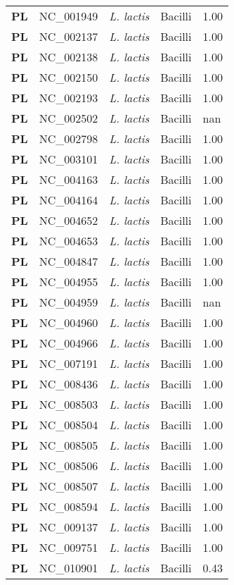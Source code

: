 \begin{adjustwidth}{-3cm}{2cm}
{\begin{supertabular}{>{\bfseries}l|p{0.1\textwidth}p{0.14\textwidth}l|l}
PL & NC\_001949 & \textit{L. lactis} & Bacilli & 1.00\\
PL & NC\_002137 & \textit{L. lactis} & Bacilli & 1.00\\
PL & NC\_002138 & \textit{L. lactis} & Bacilli & 1.00\\
PL & NC\_002150 & \textit{L. lactis} & Bacilli & 1.00\\
PL & NC\_002193 & \textit{L. lactis} & Bacilli & 1.00\\
PL & NC\_002502 & \textit{L. lactis} & Bacilli & nan\\
PL & NC\_002798 & \textit{L. lactis} & Bacilli & 1.00\\
PL & NC\_003101 & \textit{L. lactis} & Bacilli & 1.00\\
PL & NC\_004163 & \textit{L. lactis} & Bacilli & 1.00\\
PL & NC\_004164 & \textit{L. lactis} & Bacilli & 1.00\\
PL & NC\_004652 & \textit{L. lactis} & Bacilli & 1.00\\
PL & NC\_004653 & \textit{L. lactis} & Bacilli & 1.00\\
PL & NC\_004847 & \textit{L. lactis} & Bacilli & 1.00\\
PL & NC\_004955 & \textit{L. lactis} & Bacilli & 1.00\\
PL & NC\_004959 & \textit{L. lactis} & Bacilli & nan\\
PL & NC\_004960 & \textit{L. lactis} & Bacilli & 1.00\\
PL & NC\_004966 & \textit{L. lactis} & Bacilli & 1.00\\
PL & NC\_007191 & \textit{L. lactis} & Bacilli & 1.00\\
PL & NC\_008436 & \textit{L. lactis} & Bacilli & 1.00\\
PL & NC\_008503 & \textit{L. lactis} & Bacilli & 1.00\\
PL & NC\_008504 & \textit{L. lactis} & Bacilli & 1.00\\
PL & NC\_008505 & \textit{L. lactis} & Bacilli & 1.00\\
PL & NC\_008506 & \textit{L. lactis} & Bacilli & 1.00\\
PL & NC\_008507 & \textit{L. lactis} & Bacilli & 1.00\\
PL & NC\_008594 & \textit{L. lactis} & Bacilli & 1.00\\
PL & NC\_009137 & \textit{L. lactis} & Bacilli & 1.00\\
PL & NC\_009751 & \textit{L. lactis} & Bacilli & 1.00\\
PL & NC\_010901 & \textit{L. lactis} & Bacilli & 0.43\\

\end{supertabular}}
\end{adjustwidth}
